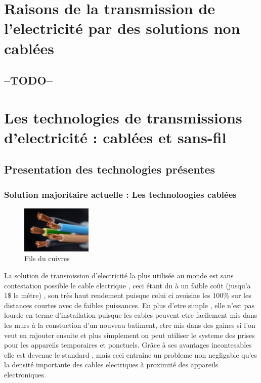 \documentclass[12pt]{report}
\begin{document}
\chapter{Raisons de la transmission de l'electricité par des solutions non cablées} %
\section{--TODO--}

\chapter{Les technologies de transmissions d'electricité : cablées et sans-fil} %
\section{Presentation des technologies présentes}
\subsection{Solution majoritaire actuelle : Les technoloogies cablées}
\begin{figure}
  \begin{center}
    \includegraphics[width=0.3\textwidth]{copperWire}
  \end{center}
  \caption{Fils du cuivres}
\end{figure} La solution de transmission d'electricité la plus utilisée au monde est sans contestation possible le cable electrique , ceci étant du à un faible coût (jusqu'a 1\$ le métre) , son très haut rendement puisque celui ci avoisine les 100\% sur les distances courtes avec de faibles puissances. En plus d'etre simple , elle n'est pas lourde en terme d'installation puisque les cables peuvent etre facilement mis dans les murs à la constuction d'un nouveau batiment, etre mis dans des gaines si l'on veut en rajouter ensuite et plus simplement on peut utiliser le systeme des prises pour les appareils temporaires et ponctuels. Grâce à ses avantages incontesables elle est devenue le standard , mais ceci entraîne un probleme non negligable qu'es la densité importante des cables electriques à proximité des appareils electroniques.
	
\end{document}
